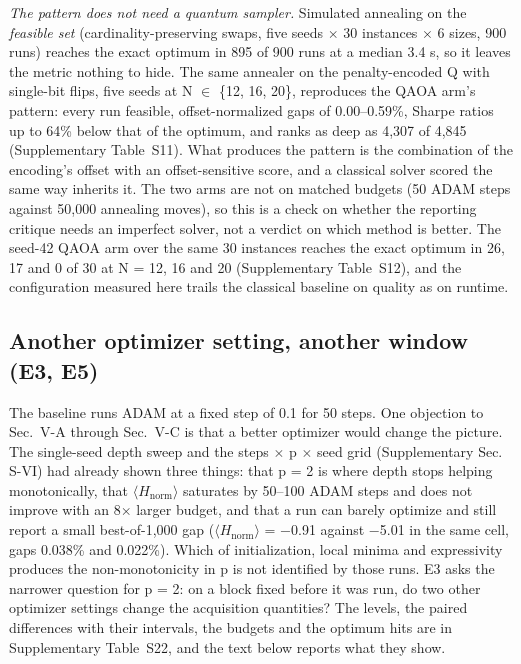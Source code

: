 \documentclass[journal]{IEEEtran}
\begin{document}
\textit{The pattern does not need a quantum sampler.} Simulated annealing on the \textit{feasible set} (cardinality-preserving swaps, five seeds $\times$ 30 instances $\times$ 6 sizes, 900 runs) reaches the exact optimum in 895 of 900 runs at a median 3.4 s, so it leaves the metric nothing to hide. The same annealer on the penalty-encoded Q with single-bit flips, five seeds at N $\in$ \{12, 16, 20\}, reproduces the QAOA arm's pattern: every run feasible, offset-normalized gaps of 0.00--0.59\%, Sharpe ratios up to 64\% below that of the optimum, and ranks as deep as 4,307 of 4,845 (Supplementary Table~S11). What produces the pattern is the combination of the encoding's offset with an offset-sensitive score, and a classical solver scored the same way inherits it. The two arms are not on matched budgets (50 ADAM steps against 50,000 annealing moves), so this is a check on whether the reporting critique needs an imperfect solver, not a verdict on which method is better. The seed-42 QAOA arm over the same 30 instances reaches the exact optimum in 26, 17 and 0 of 30 at N = 12, 16 and 20 (Supplementary Table~S12), and the configuration measured here trails the classical baseline on quality as on runtime.


\subsection{Another optimizer setting, another window (E3, E5)}


The baseline runs ADAM at a fixed step of 0.1 for 50 steps. One objection to Sec.~V-A through Sec.~V-C is that a better optimizer would change the picture. The single-seed depth sweep and the steps $\times$ p $\times$ seed grid (Supplementary Sec. S-VI) had already shown three things: that p = 2 is where depth stops helping monotonically, that $\langle$$H_{\mathrm{norm}}$$\rangle$ saturates by 50--100 ADAM steps and does not improve with an 8$\times$ larger budget, and that a run can barely optimize and still report a small best-of-1,000 gap ($\langle$$H_{\mathrm{norm}}$$\rangle$ = $-$0.91 against $-$5.01 in the same cell, gaps 0.038\% and 0.022\%). Which of initialization, local minima and expressivity produces the non-monotonicity in p is not identified by those runs. E3 asks the narrower question for p = 2: on a block fixed before it was run, do two other optimizer settings change the acquisition quantities? The levels, the paired differences with their intervals, the budgets and the optimum hits are in Supplementary Table~S22, and the text below reports what they show.
\end{document}

